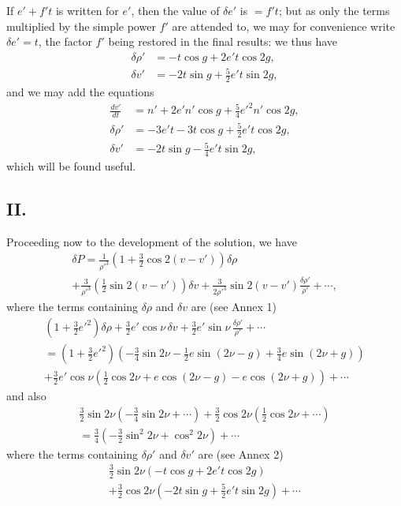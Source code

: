 \documentclass[11pt,a4paper]{book}
\begin{document}
If $e' + f't$ is written for $e'$, then the value of $\delta e'$ is $= f't$; but as only the terms multiplied by the simple power $f'$ are attended to, we may for convenience write $\delta e' = t$, the factor $f'$ being restored in the final results: we thus have
\begin{align*}
\delta\rho' &= -t\cos g + 2e't\cos 2g, \\
\delta v' &= -2t\sin g + \tfrac{5}{2}e't\sin 2g,
\end{align*}
and we may add the equations
\begin{align*}
\frac{dv'}{dt} &= n' + 2e'n'\cos g + \tfrac{5}{4}e'^2n'\cos 2g, \\
\delta\rho' &= -3e't - 3t\cos g + \tfrac{5}{2}e't\cos 2g, \\
\delta v' &= -2t\sin g - \tfrac{5}{4}e't\sin 2g,
\end{align*}
which will be found useful.

\subsection*{II.}

Proceeding now to the development of the solution, we have
\begin{multline}
\delta P = \frac{1}{\rho'^3}\left(1 + \tfrac{3}{2}\cos 2(v-v')\right)\delta\rho \\
+ \frac{3}{\rho'^3}\left(\tfrac{1}{2}\sin 2(v-v')\right)\delta v + \frac{3}{2\rho'^3}\sin 2(v-v')\frac{\delta\rho'}{\rho'} + \cdots,
\end{multline}
where the terms containing $\delta\rho$ and $\delta v$ are (see Annex 1)
\begin{multline*}
\left(1 + \tfrac{3}{2}e'^2\right)\delta\rho + \tfrac{3}{2}e'\cos\nu\,\delta v + \tfrac{3}{2}e'\sin\nu\,\frac{\delta\rho'}{\rho'} + \cdots \\
= \left(1 + \tfrac{3}{2}e'^2\right)\left(-\tfrac{3}{4}\sin 2\nu - \tfrac{1}{2}e\sin(2\nu-g) + \tfrac{3}{4}e\sin(2\nu+g)\right) \\
+ \tfrac{3}{2}e'\cos\nu\left(\tfrac{1}{2}\cos 2\nu + e\cos(2\nu-g) - e\cos(2\nu+g)\right) + \cdots
\end{multline*}
and also
\begin{multline*}
\tfrac{3}{2}\sin 2\nu\left(-\tfrac{3}{4}\sin 2\nu + \cdots\right) + \tfrac{3}{2}\cos 2\nu\left(\tfrac{1}{2}\cos 2\nu + \cdots\right) \\
= \tfrac{3}{4}\left(-\tfrac{3}{2}\sin^2 2\nu + \cos^2 2\nu\right) + \cdots
\end{multline*}
where the terms containing $\delta\rho'$ and $\delta v'$ are (see Annex 2)
\begin{multline*}
\tfrac{3}{2}\sin 2\nu\left(-t\cos g + 2e't\cos 2g\right) \\
+ \tfrac{3}{2}\cos 2\nu\left(-2t\sin g + \tfrac{5}{2}e't\sin 2g\right) + \cdots
\end{multline*}
\end{document}
